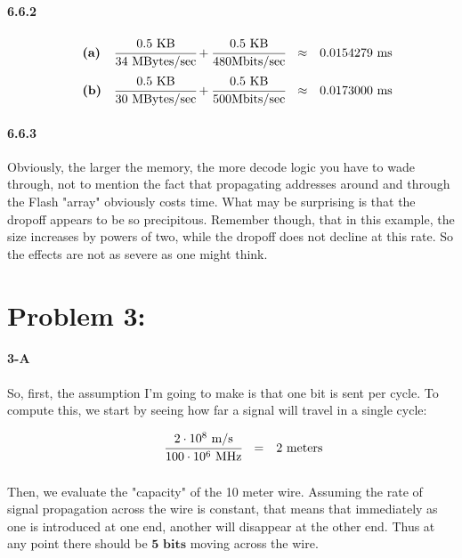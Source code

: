 \documentclass[a4paper]{article}
\begin{document}
\paragraph{6.6.2}

\begin{equation}
\begin{array}{llrll}
& \textbf{(a)} & \cfrac{0.5 \mbox{ KB}}{34 \mbox{ MBytes/sec}} + \cfrac{0.5 \mbox{ KB}}{480 \mbox{Mbits/sec}} & \approx & 0.0154279 \mbox{ ms} \\[.15in]
& \textbf{(b)} & \cfrac{0.5 \mbox{ KB}}{30 \mbox{ MBytes/sec}} + \cfrac{0.5 \mbox{ KB}}{500 \mbox{Mbits/sec}} & \approx & 0.0173000 \mbox{ ms}
\end{array}
\end{equation}

\paragraph{6.6.3} Obviously, the larger the memory, the more decode logic you have to wade through, not to mention the fact that propagating addresses around and through the Flash "array" obviously costs time. What may be surprising is that the dropoff appears to be so precipitous. Remember though, that in this example, the size increases by powers of two, while the dropoff does not decline at this rate. So the effects are not as severe as one might think.

\section*{Problem 3:}

\paragraph{3-A} So, first, the assumption I'm going to make is that one bit is sent per cycle. To compute this, we start by seeing how far a signal will travel in a single cycle:

\begin{equation}
\begin{array}{llrll}
& & \cfrac{2 \cdot 10^8 \mbox{ m/s}}{100 \cdot 10^6 \mbox{ MHz}} & = & 2 \mbox{ meters} \\[.15in]
\end{array}
\end{equation}

Then, we evaluate the "capacity" of the 10 meter wire. Assuming the rate of signal propagation across the wire is constant, that means that immediately as one is introduced at one end, another will disappear at the other end. Thus at any point there should be $\textbf{5 bits}$ moving across the wire.
\end{document}
